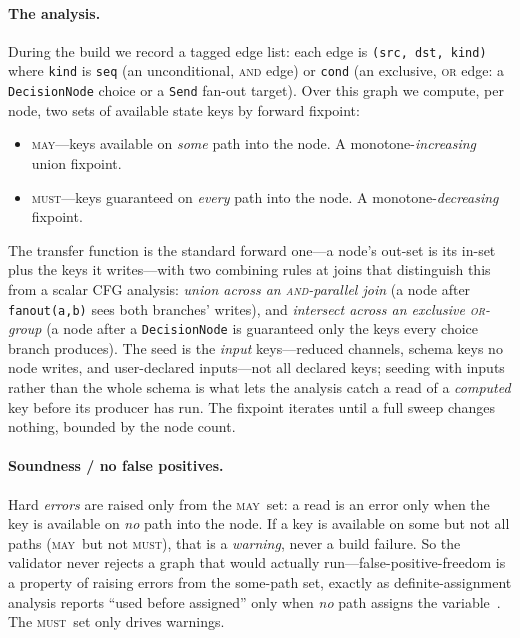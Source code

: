 \documentclass[11pt]{article}
\newcommand{\may}{\textsc{may}}
\newcommand{\must}{\textsc{must}}
\newcommand{\code}[1]{\texttt{#1}}
\begin{document}
\paragraph{The analysis.} During the build we record a tagged edge list:
each edge is \code{(src, dst, kind)} where \code{kind} is \code{seq} (an
unconditional, \textsc{and} edge) or \code{cond} (an exclusive, \textsc{or} edge:
a \code{DecisionNode} choice or a \code{Send} fan-out target). Over this graph we
compute, per node, two sets of available state keys by forward fixpoint:
\begin{itemize}[noitemsep,topsep=2pt]
  \item \may---keys available on \emph{some} path into the node. A
  monotone-\emph{increasing} union fixpoint.
  \item \must---keys guaranteed on \emph{every} path into the node. A
  monotone-\emph{decreasing} fixpoint.
\end{itemize}
The transfer function is the standard forward one---a node's out-set is its
in-set plus the keys it writes---with two combining rules at joins that
distinguish this from a scalar CFG analysis:
\emph{union across an \textsc{and}-parallel join} (a node after \code{fanout(a,b)}
sees both branches' writes), and \emph{intersect across an exclusive
\textsc{or}-group} (a node after a \code{DecisionNode} is guaranteed only the keys
every choice branch produces). The seed is the \emph{input} keys---reduced
channels, schema keys no node writes, and user-declared inputs---not all declared
keys; seeding with inputs rather than the whole schema is what lets the analysis
catch a read of a \emph{computed} key before its producer has run. The fixpoint
iterates until a full sweep changes nothing, bounded by the node count.

\paragraph{Soundness / no false positives.} Hard \emph{errors} are raised only
from the \may\ set: a read is an error only when the key is available on
\emph{no} path into the node. If a key is available on some but not all paths
(\may\ but not \must), that is a \emph{warning}, never a build failure. So the
validator never rejects a graph that would actually run---false-positive-freedom
is a property of raising errors from the some-path set, exactly as
definite-assignment analysis reports ``used before assigned'' only when
\emph{no} path assigns the variable~\citep{jls,nielson}. The \must\ set only
drives warnings.
\end{document}
